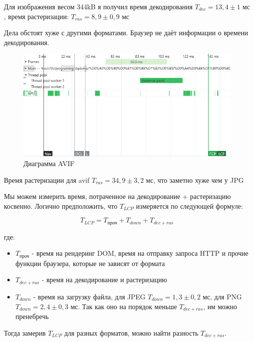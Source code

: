 \documentclass[12pt]{article}
\begin{document}
Для изображения весом 344kB я получил время декодирования
$T_{dec}=13,4 \pm 1 \text{ мс}$, время растеризации: $T_{ras}=8,9 \pm 0,9 \text{ мс}$

Дела обстоят хуже с другими форматами. Браузер не даёт информации о
времени декодирования.

\begin{figure}[H]
    \centering
    \includegraphics[width=1\textwidth]{../images/image_comp/avif_one_image.png}
    \caption{Диаграмма AVIF}
\end{figure}

Время растеризации для avif $T_{ras}=34,9 \pm 3,2\text{ мс}$, что заметно хуже чем у JPG

Мы можем измерить время, потраченное на декодирование + растеризацию косвенно.
Логично предположить, что $T_{LCP}$ измеряется по следующей формуле:

\[
    T_{LCP} = T_{\text{проч}} + T_{down} + T_{dec+ras}
\]

где:

\begin{itemize}
    \item $T_{\text{проч}}$ - время на рендеринг DOM, время на отправку
          запроса HTTP и прочие
          функции браузера, которые не зависят от формата
    \item $T_{dec+ras}$ - время на декодирование и растеризацию

    \item $T_{down}$ - время на загрузку файла, для JPEG $T_{down} = 1,3 \pm 0,2 \text{ мс}$,
          для PNG $T_{down} = 2,4 \pm 0,3 \text{ мс}$. Так как оно на порядок меньше $T_{dec+ras}$,
          им можно пренебречь
\end{itemize}

Тогда замерив $T_{LCP}$ для разных форматов, можно найти разность $T_{dec+ras}$.
\end{document}
